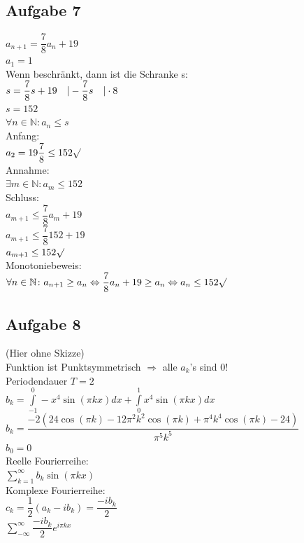 \documentclass[11pt,final]{scrreprt}
\newcommand{\br} {\medskip\\}
\newcommand{\N} {\mathbb N}
\begin{document}
\subsection*{Aufgabe 7}
$ a_{n+1} = \dfrac{7}{8} a_n + 19 $\\
$ a_1 = 1 $\\
Wenn beschränkt, dann ist die Schranke s:\\
$ s = \dfrac{7}{8} s + 19 \hspace*{1em} | -\dfrac{7}{8}s \hspace*{1em} | \cdot 8$\\
$ s = 152 $\\
$ \forall n\in\N\colon a_n \leq s $\\
Anfang:\\
$a_2 = 19\dfrac{7}{8} \leq 152 \surd$\\
Annahme:\\
$\exists m\in\N\colon a_m \leq 152$\\
Schluss:\\
$ a_{m+1} \leq \dfrac{7}{8} a_m + 19 $\\
$ a_{m+1} \leq \dfrac{7}{8} 152 + 19 $\\
$ a_{m+1} \leq 152 \surd$\br
Monotoniebeweis:\\
$ \forall n\in\N\colon a_{n+1} \geq a_n \Leftrightarrow \dfrac{7}{8} a_n + 19 \geq a_n \Leftrightarrow a_n \leq 152 \surd $

\subsection*{Aufgabe 8}
(Hier ohne Skizze)\\
Funktion ist Punktsymmetrisch $\Rightarrow$ alle $a_k$'s sind 0!\\
Periodendauer $T = 2$\\
$ b_k = \int\limits_{-1}^0 -x^4\sin(\pi kx)dx + \int\limits_{0}^1 x^4\sin(\pi kx)dx $\\ 
$ b_k = \dfrac{-2(24\cos(\pi k) - 12\pi^2k^2\cos(\pi k) + \pi^4k^4\cos(\pi k)-24)}{\pi^5k^5} $\\
$ b_0 = 0$\\
Reelle Fourierreihe:\\
$ \sum\limits_{k=1}^\infty b_k\sin(\pi kx) $\\
Komplexe Fourierreihe:\\
$ c_k = \dfrac{1}{2}(a_k-ib_k) = \dfrac{-ib_k}{2} $\\
$ \sum\limits_{-\infty}^\infty \dfrac{-ib_k}{2} e^{i\pi kx} $\\
\end{document}
